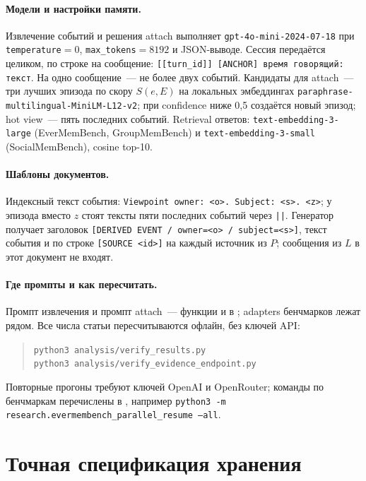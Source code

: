 \documentclass[11pt,a4paper]{article}
\begin{document}
\begin{sloppypar}
\paragraph{Модели и настройки памяти.}
Извлечение событий и решения attach выполняет \texttt{gpt-4o-mini-2024-07-18}
при \texttt{temperature}${}=0$, \texttt{max\_tokens}${}=8192$ и JSON-выводе. Сессия
передаётся целиком, по строке на сообщение:
\texttt{[[turn\_id]] [ANCHOR] время говорящий: текст}. На одно сообщение~--- не более
двух событий. Кандидаты для attach~--- три лучших эпизода по скору $S(e,E)$ на
локальных эмбеддингах \texttt{paraphrase-multilingual-MiniLM-L12-v2}; при confidence
ниже 0,5 создаётся новый эпизод; hot view~--- пять последних событий. Retrieval
ответов: \texttt{text-embedding-3-large} (EverMemBench, GroupMemBench) и
\texttt{text-embedding-3-small} (SocialMemBench), cosine top-10.

\paragraph{Шаблоны документов.}
Индексный текст события: \texttt{Viewpoint owner: <o>. Subject: <s>. <z>}; у эпизода
вместо $z$ стоят тексты пяти последних событий через \texttt{||}. Генератор получает
заголовок \texttt{[DERIVED EVENT / owner=<o> / subject=<s>]}, текст события и по строке
\texttt{[SOURCE <id>]} на каждый источник из $P$; сообщения из $L$ в этот документ не
входят.

\paragraph{Где промпты и как пересчитать.}
Промпт извлечения и промпт attach~--- функции  и
 в ;
adapters бенчмарков лежат рядом. Все числа статьи пересчитываются офлайн, без
ключей API:
\begin{quote}\small
\texttt{python3 analysis/verify\_results.py}\\
\texttt{python3 analysis/verify\_evidence\_endpoint.py}
\end{quote}
Повторные прогоны требуют ключей OpenAI и OpenRouter; команды по бенчмаркам
перечислены в , например
\texttt{python3 -m research.evermembench\_parallel\_resume --all}.
\end{sloppypar}

\section{Точная спецификация хранения}
\end{document}
